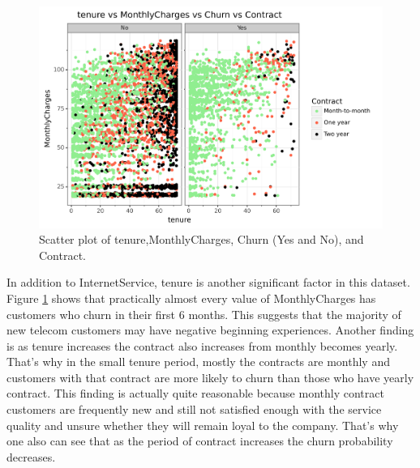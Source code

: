 \begin{figure}[!htbp]
	\centering
	\includegraphics[width=0.9\linewidth]{figures/tenurechurn}
	\caption{Scatter plot of tenure,MonthlyCharges, Churn (Yes and No), and Contract.}
	\label{fig:tenure_churn}
\end{figure}
In addition to InternetService, tenure is another significant factor in this dataset. Figure \ref{fig:tenure_churn} shows that practically almost every value of MonthlyCharges has customers who churn in their first 6 months. This suggests that the majority of new telecom customers may have negative beginning experiences. Another finding is as tenure increases the contract also increases from monthly becomes yearly. That's why in the small tenure period, mostly the contracts are monthly and customers with that contract are more likely to churn than those who have yearly contract.  This finding is actually quite reasonable because monthly contract customers are frequently new and still not satisfied enough with the service quality and unsure whether they will remain loyal to the company. That's why one also can see that as the period of contract increases the churn probability decreases.
 